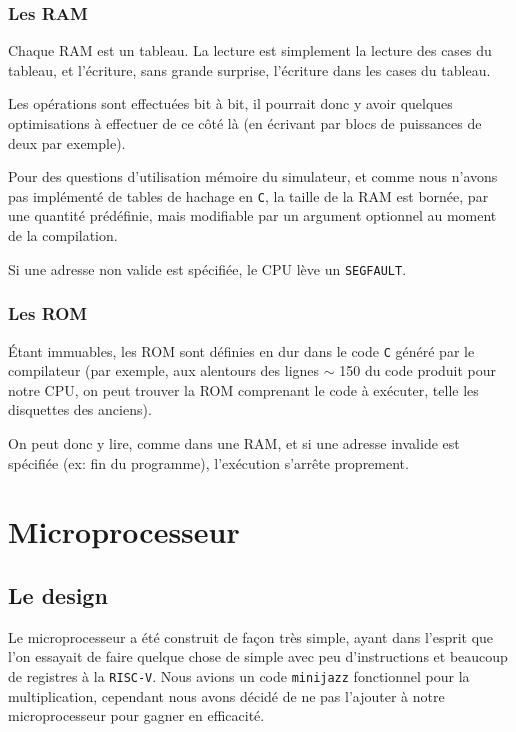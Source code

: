 \documentclass[10pt,a4paper,notitlepage ]{article}
\begin{document}
	\subsubsection{Les RAM}
	
	Chaque RAM est un tableau. La lecture est simplement la lecture des cases du tableau, et l'écriture, sans grande surprise, l'écriture dans les cases du tableau.
	
	Les opérations sont effectuées bit à bit, il pourrait donc y avoir quelques optimisations à effectuer de ce côté là (en écrivant par blocs de puissances de deux par exemple).
	
	Pour des questions d'utilisation mémoire du simulateur, et comme nous n'avons pas implémenté de tables de hachage en \texttt{C}, la taille de la RAM est bornée, par une quantité prédéfinie, mais modifiable par un argument optionnel au moment de la compilation.
	
	Si une adresse non valide est spécifiée, le CPU lève un \texttt{SEGFAULT}.
	
	\subsubsection{Les ROM}
	
	Étant immuables, les ROM sont définies en dur dans le code \texttt{C} généré par le compilateur (par exemple, aux alentours des lignes  $\sim$ 150 du code produit pour notre CPU, on peut trouver la ROM comprenant le code à exécuter, telle les disquettes des anciens).
	
	On peut donc y lire, comme dans une RAM, et si une adresse invalide est spécifiée (ex: fin du programme), l'exécution s'arrête proprement.
	
	
	\section{Microprocesseur}

		\subsection{Le design}

		Le microprocesseur a été construit de façon très simple, ayant dans l'esprit que l'on essayait de faire quelque chose de simple avec peu d'instructions et beaucoup de registres à la \texttt{RISC-V}. Nous avions un code \texttt{minijazz} fonctionnel pour la multiplication, cependant nous avons décidé de ne pas l'ajouter à notre microprocesseur pour gagner en efficacité.
\end{document}
